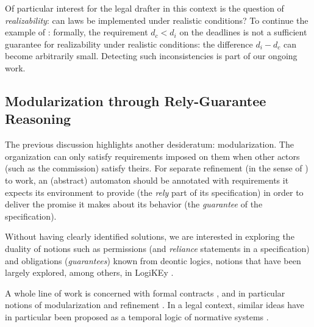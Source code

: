 Of particular interest for the legal drafter in this context is the question
of \emph{realizability}: can laws be implemented under realistic conditions?
To continue the example of : formally, the
requirement $d_c < d_i$ on the deadlines is not a sufficient guarantee for
realizability under realistic conditions: the difference $d_i - d_c$ can
become arbitrarily small. Detecting such inconsistencies is part of our
ongoing work.

\subsection{Modularization through Rely-Guarantee Reasoning}\label{sec:rely_guarantee}

The previous discussion highlights another desideratum: modularization. The
organization can only satisfy requirements imposed on them when other actors
(such as the commission) satisfy theirs. For separate refinement (in the sense
of ) to work, an (abstract) automaton should be
annotated with requirements it expects its environment to provide (the
\emph{rely} part of its specification) in order to deliver the promise it
makes about its behavior (the \emph{guarantee} of the specification). 

Without having clearly identified solutions, we are interested in exploring
the duality of notions such as permissions (and \emph{reliance} statements in
a specification) and obligations (\emph{guarantees}) known from deontic
logics, notions that have been largely explored, among others, in LogiKEy
\cite{benzmueller_etal_logikey_2020}. 

A whole line of work is concerned with formal contracts
\cite{benveniste_raclet_etal_ContractsMonograph2018}, and in particular
notions of modularization and refinement
\cite{Alfaro2005,grumberg_lang_model_checking_modular_verification_2004}. In a
legal context, similar ideas have in particular been proposed as a temporal
logic of normative systems
\cite{agotnes_hoek_aguilar_sierra_woolridge_temporal_logic_normative_systems_2009}. 

